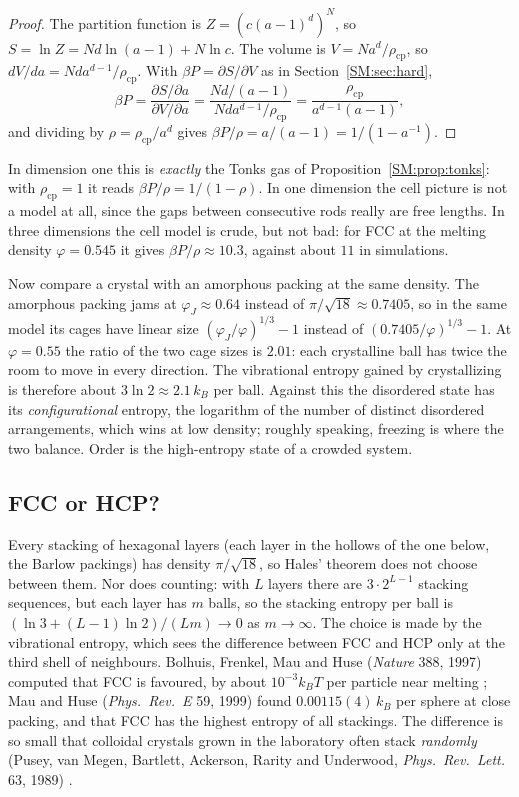 \documentclass[11pt,openany]{book}
\theoremstyle{plain}
\theoremstyle{definition}
\theoremstyle{remark}
\begin{document}
\begin{proof}
The partition function is $Z=(c(a-1)^d)^N$, so $S=\ln Z=Nd\ln(a-1)+N\ln c$. The volume is
$V=Na^d/\rho_{\mathrm{cp}}$, so $dV/da=Nda^{d-1}/\rho_{\mathrm{cp}}$. With $\beta P=\partial S/\partial V$ as in
Section~\ref{SM:sec:hard},
\[
  \beta P=\frac{\partial S/\partial a}{\partial V/\partial a}=\frac{Nd/(a-1)}{Nda^{d-1}/\rho_{\mathrm{cp}}}
  =\frac{\rho_{\mathrm{cp}}}{a^{d-1}(a-1)},
\]
and dividing by $\rho=\rho_{\mathrm{cp}}/a^d$ gives $\beta P/\rho=a/(a-1)=1/(1-a^{-1})$.
\end{proof}

In dimension one this is \emph{exactly} the Tonks gas of Proposition~\ref{SM:prop:tonks}: with
$\rho_{\mathrm{cp}}=1$ it reads $\beta P/\rho=1/(1-\rho)$. In one dimension the cell picture is not a
model at all, since the gaps between consecutive rods really are free lengths. In three dimensions the
cell model is crude, but not bad: for FCC at the melting density $\varphi=0.545$ it gives
$\beta P/\rho\approx10.3$, against about $11$ in simulations.

Now compare a crystal with an amorphous packing at the same density. The amorphous packing jams at
$\varphi_J\approx0.64$ instead of $\pi/\sqrt{18}\approx0.7405$, so in the same model its cages have linear size
$(\varphi_J/\varphi)^{1/3}-1$ instead of $(0.7405/\varphi)^{1/3}-1$. At $\varphi=0.55$ the ratio of the two cage sizes
is $2.01$: each crystalline ball has twice the room to move in every direction. The vibrational entropy
gained by crystallizing is therefore about $3\ln2\approx2.1\,k_B$ per ball. Against this the disordered
state has its \emph{configurational} entropy, the logarithm of the number of distinct disordered
arrangements, which wins at low density; roughly speaking, freezing is where the two balance. Order is the high-entropy state of a crowded system.

\subsection*{FCC or HCP?}
Every stacking of hexagonal layers (each layer in the hollows of the one below, the Barlow packings)
has density $\pi/\sqrt{18}$, so Hales' theorem does not choose between them. Nor does counting: with $L$
layers there are $3\cdot2^{L-1}$ stacking sequences, but each layer has $m$ balls, so the stacking entropy
per ball is $(\ln3+(L-1)\ln2)/(Lm)\to0$ as $m\to\infty$. The choice is made by the vibrational entropy,
which sees the difference between FCC and HCP only at the third shell of neighbours. Bolhuis, Frenkel,
Mau and Huse (\emph{Nature} 388, 1997) computed that FCC is favoured, by about $10^{-3}k_BT$ per particle
near melting ; Mau and Huse (\emph{Phys.\ Rev.~E} 59, 1999) found $0.00115(4)\,k_B$ per sphere at close
packing, and that FCC has the highest entropy of all stackings. The difference is so small that colloidal
crystals grown in the laboratory often stack \emph{randomly} (Pusey, van Megen, Bartlett, Ackerson,
Rarity and Underwood, \emph{Phys.\ Rev.\ Lett.} 63, 1989) .
\end{document}
